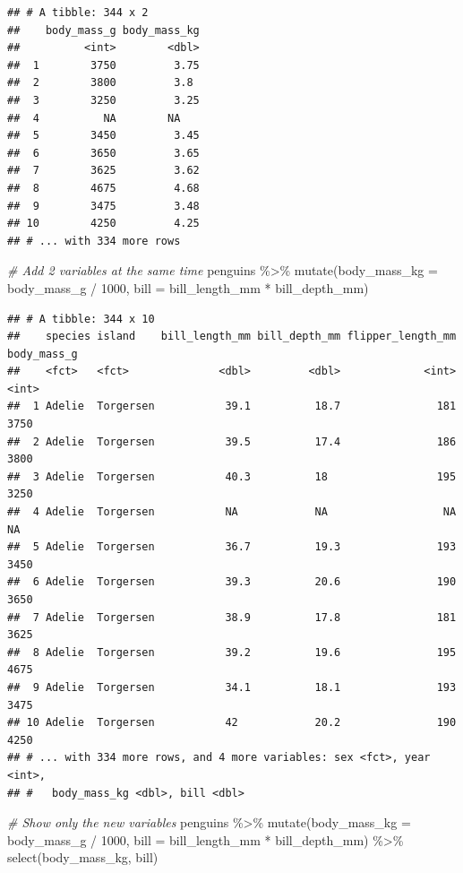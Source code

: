 \documentclass[
]{article}
\newenvironment{Shaded}{\begin{snugshade}}{\end{snugshade}}
\newcommand{\AttributeTok}[1]{\textcolor[rgb]{0.77,0.63,0.00}{#1}}
\newcommand{\CommentTok}[1]{\textcolor[rgb]{0.56,0.35,0.01}{\textit{#1}}}
\newcommand{\DecValTok}[1]{\textcolor[rgb]{0.00,0.00,0.81}{#1}}
\newcommand{\FunctionTok}[1]{\textcolor[rgb]{0.00,0.00,0.00}{#1}}
\newcommand{\NormalTok}[1]{#1}
\newcommand{\SpecialCharTok}[1]{\textcolor[rgb]{0.00,0.00,0.00}{#1}}
\begin{document}
\begin{verbatim}
## # A tibble: 344 x 2
##    body_mass_g body_mass_kg
##          <int>        <dbl>
##  1        3750         3.75
##  2        3800         3.8 
##  3        3250         3.25
##  4          NA        NA   
##  5        3450         3.45
##  6        3650         3.65
##  7        3625         3.62
##  8        4675         4.68
##  9        3475         3.48
## 10        4250         4.25
## # ... with 334 more rows
\end{verbatim}

\begin{Shaded}
\begin{Highlighting}[]
\CommentTok{\# Add 2 variables at the same time}
\NormalTok{penguins }\SpecialCharTok{\%\textgreater{}\%} 
  \FunctionTok{mutate}\NormalTok{(}\AttributeTok{body\_mass\_kg =}\NormalTok{ body\_mass\_g }\SpecialCharTok{/} \DecValTok{1000}\NormalTok{, }
         \AttributeTok{bill =}\NormalTok{ bill\_length\_mm }\SpecialCharTok{*}\NormalTok{ bill\_depth\_mm)}
\end{Highlighting}
\end{Shaded}

\begin{verbatim}
## # A tibble: 344 x 10
##    species island    bill_length_mm bill_depth_mm flipper_length_mm body_mass_g
##    <fct>   <fct>              <dbl>         <dbl>             <int>       <int>
##  1 Adelie  Torgersen           39.1          18.7               181        3750
##  2 Adelie  Torgersen           39.5          17.4               186        3800
##  3 Adelie  Torgersen           40.3          18                 195        3250
##  4 Adelie  Torgersen           NA            NA                  NA          NA
##  5 Adelie  Torgersen           36.7          19.3               193        3450
##  6 Adelie  Torgersen           39.3          20.6               190        3650
##  7 Adelie  Torgersen           38.9          17.8               181        3625
##  8 Adelie  Torgersen           39.2          19.6               195        4675
##  9 Adelie  Torgersen           34.1          18.1               193        3475
## 10 Adelie  Torgersen           42            20.2               190        4250
## # ... with 334 more rows, and 4 more variables: sex <fct>, year <int>,
## #   body_mass_kg <dbl>, bill <dbl>
\end{verbatim}

\begin{Shaded}
\begin{Highlighting}[]
\CommentTok{\# Show only the new variables}
\NormalTok{penguins }\SpecialCharTok{\%\textgreater{}\%} 
  \FunctionTok{mutate}\NormalTok{(}\AttributeTok{body\_mass\_kg =}\NormalTok{ body\_mass\_g }\SpecialCharTok{/} \DecValTok{1000}\NormalTok{, }
         \AttributeTok{bill =}\NormalTok{ bill\_length\_mm }\SpecialCharTok{*}\NormalTok{ bill\_depth\_mm) }\SpecialCharTok{\%\textgreater{}\%} 
  \FunctionTok{select}\NormalTok{(body\_mass\_kg, }
\NormalTok{         bill)}
\end{Highlighting}
\end{Shaded}
\end{document}
